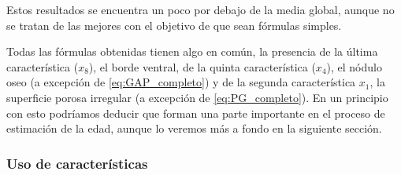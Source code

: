 Estos resultados se encuentra un poco por debajo de la media global, aunque no se tratan de las mejores con el objetivo de que sean fórmulas simples.

Todas las fórmulas obtenidas tienen algo en común, la presencia de la última característica ($x_8$), el borde ventral, de la quinta característica ($x_4$), el nódulo oseo (a excepción de \ref{eq:GAP_completo}) y de la segunda característica $x_1$, la superficie porosa irregular (a excepción de \ref{eq:PG_completo}). En un principio con esto podríamos deducir que forman una parte importante en el proceso de estimación de la edad, aunque lo veremos más a fondo en la siguiente sección.



\subsubsection{Uso de características}






\newpage
